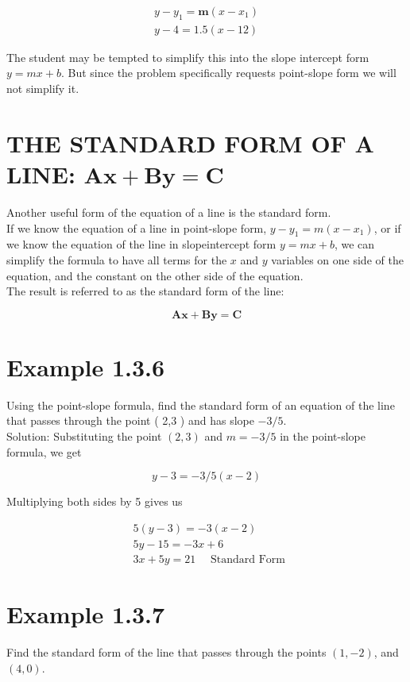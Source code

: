 $$
\begin{gathered}
y-y_{1}=\mathbf{m}\left(x-x_{1}\right) \\
y-4=1.5(x-12)
\end{gathered}
$$

The student may be tempted to simplify this into the slope intercept form $y=m x+b$. But since the problem specifically requests point-slope form we will not simplify it.

\section*{THE STANDARD FORM OF A LINE: $\boldsymbol{A} \boldsymbol{x}+\boldsymbol{B} \boldsymbol{y}=\boldsymbol{C}$}
Another useful form of the equation of a line is the standard form.\\
If we know the equation of a line in point-slope form, $y-y_{1}=m\left(x-x_{1}\right)$, or if we know the equation of the line in slopeintercept form $y=m x+b$, we can simplify the formula to have all terms for the $x$ and $y$ variables on one side of the equation, and the constant on the other side of the equation.\\
The result is referred to as the standard form of the line:

$$
\mathbf{A x}+\mathbf{B y}=\mathbf{C}
$$

\section*{Example 1.3.6}
Using the point-slope formula, find the standard form of an equation of the line that passes through the point ( 2,3 ) and has slope $-3 / 5$.\\
Solution: Substituting the point $(2,3)$ and $m=-3 / 5$ in the point-slope formula, we get

$$
y-3=-3 / 5(x-2)
$$

Multiplying both sides by 5 gives us

$$
\begin{aligned}
& 5(y-3)=-3(x-2) \\
& 5 y-15=-3 x+6 \\
& 3 x+5 y=21 \quad \text { Standard Form }
\end{aligned}
$$

\section*{Example 1.3.7}
Find the standard form of the line that passes through the points $(1,-2)$, and $(4,0)$.

